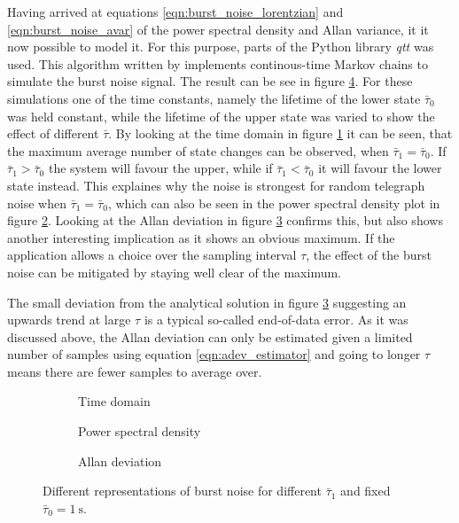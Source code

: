 Having arrived at equations \ref{eqn:burst_noise_lorentzian} and \ref{eqn:burst_noise_avar} of the power spectral density and Allan variance, it it now possible to model it. For this purpose, parts of the Python library \textit{qtt} \cite{qtt} was used. This algorithm written by \citeauthor{qtt} implements continous-time Markov chains to simulate the burst noise signal. The result can be see in figure \ref{fig:burst_noise_simulated}. For these simulations one of the time constants, namely the lifetime of the lower state $\bar \tau_0$ was held constant, while the lifetime of the upper state was varied to show the effect of different $\bar \tau$. By looking at the time domain in figure \ref{fig:burst_noise_time} it can be seen, that the maximum average number of state changes can be observed, when $\bar \tau_1 = \bar \tau_0$. If $\bar \tau_1 > \bar \tau_0$ the system will favour the upper, while if $\bar \tau_1 < \bar \tau_0$ it will favour the lower state instead. This explaines why the noise is strongest for random telegraph noise when $\bar \tau_1 = \bar \tau_0$, which can also be seen in the power spectral density plot in figure \ref{fig:burst_noise_psd}. Looking at the Allan deviation in figure \ref{fig:burst_noise_adev} confirms this, but also shows another interesting implication as it shows an obvious maximum. If the application allows a choice over the sampling interval $\tau$, the effect of the burst noise can be mitigated by staying well clear of the maximum.

The small deviation from the analytical solution in figure \ref{fig:burst_noise_adev} suggesting an upwards trend at large $\tau$ is a typical so-called end-of-data error. As it was discussed above, the Allan deviation can only be estimated given a limited number of samples using equation \ref{eqn:adev_estimator} and going to longer $\tau$ means there are fewer samples to average over.

\begin{figure}[ht]
    \centering
    \begin{subfigure}{0.8\linewidth}
        \centering
        \scalebox{1}{%
            
        } %
        \caption{Time domain}
        \label{fig:burst_noise_time}
    \end{subfigure}
    \begin{subfigure}{0.8\linewidth}
        \centering
        \scalebox{1}{%
            
        } %
        \caption{Power spectral density}
        \label{fig:burst_noise_psd}
    \end{subfigure}
    \begin{subfigure}{0.8\linewidth}
        \centering
        \scalebox{1}{%
            
        } %
        \caption{Allan deviation}
        \label{fig:burst_noise_adev}
    \end{subfigure}
    \caption{Different representations of burst noise for different $\bar \tau_1$ and fixed $\bar \tau_0 = \qty{1}{\s}$.}
    \label{fig:burst_noise_simulated}
\end{figure}

